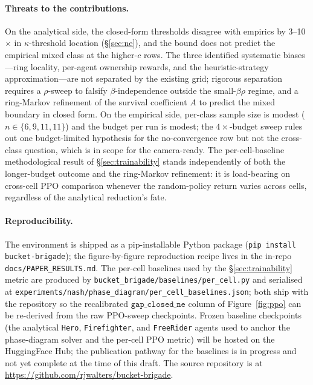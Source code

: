 \documentclass{anvil-paper}
\begin{document}
\paragraph{Threats to the contributions.}
On the analytical side, the closed-form thresholds disagree with
empirics by 3--10$\times$ in $\kappa$-threshold location
(\S\ref{sec:ne}), and the bound does not predict the empirical
\textsf{mixed} class at the higher-$c$ rows. The three identified
systematic biases---ring locality, per-agent ownership rewards, and the
heuristic-strategy approximation---are not separated by the existing
grid; rigorous separation requires a $\rho$-sweep to falsify
$\beta$-independence outside the small-$\beta\rho$ regime, and a
ring-Markov refinement of the survival coefficient $A$ to predict the
\textsf{mixed} boundary in closed form. On the empirical side, per-class
sample size is modest ($n\in\{6,9,11,11\}$) and the budget per run is
modest; the $4{\times}$-budget sweep rules out one budget-limited
hypothesis for the no-convergence row but not the cross-class question,
which is in scope for the camera-ready. The per-cell-baseline
methodological result of \S\ref{sec:trainability} stands independently
of both the longer-budget outcome and the ring-Markov refinement: it is
load-bearing on cross-cell PPO comparison whenever the random-policy
return varies across cells, regardless of the analytical reduction's
fate.

\paragraph{Reproducibility.}
The environment is shipped as a pip-installable Python package
(\texttt{pip install bucket-brigade}); the figure-by-figure reproduction
recipe lives in the in-repo \texttt{docs/PAPER\_RESULTS.md}. The per-cell
baselines used by the \S\ref{sec:trainability} metric are produced by
\texttt{bucket\_brigade/baselines/per\_cell.py} and serialised at
\texttt{experiments/nash/phase\_diagram/per\_cell\_baselines.json}; both
ship with the repository so the recalibrated $\texttt{gap\_closed\_ne}$
column of Figure~\ref{fig:ppo} can be re-derived from the raw PPO-sweep
checkpoints.
Frozen baseline checkpoints (the analytical \texttt{Hero},
\texttt{Firefighter}, and \texttt{FreeRider} agents used to anchor the
phase-diagram solver and the per-cell PPO metric) will be hosted on the
HuggingFace Hub; the publication pathway for the baselines is in progress
and not yet complete at the time of this draft. The source repository is at
\url{https://github.com/rjwalters/bucket-brigade}.
\end{document}
